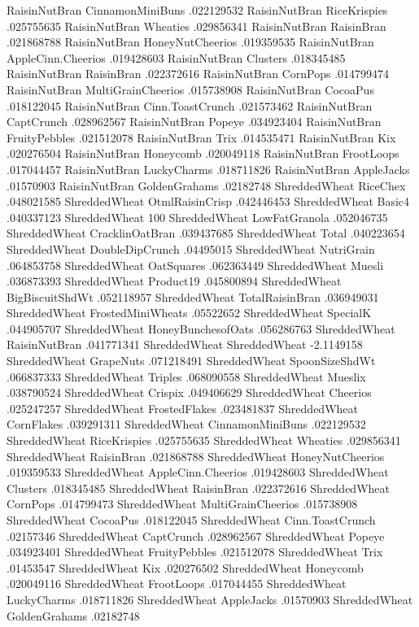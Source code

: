 RaisinNutBran	CinnamonMiniBuns	.022129532
RaisinNutBran	RiceKrispies	.025755635
RaisinNutBran	Wheaties	.029856341
RaisinNutBran	RaisinBran	.021868788
RaisinNutBran	HoneyNutCheerios	.019359535
RaisinNutBran	AppleCinn.Cheerios	.019428603
RaisinNutBran	Clusters	.018345485
RaisinNutBran	RaisinBran	.022372616
RaisinNutBran	CornPops	.014799474
RaisinNutBran	MultiGrainCheerios	.015738908
RaisinNutBran	CocoaPus	.018122045
RaisinNutBran	Cinn.ToastCrunch	.021573462
RaisinNutBran	CaptCrunch	.028962567
RaisinNutBran	Popeye	.034923404
RaisinNutBran	FruityPebbles	.021512078
RaisinNutBran	Trix	.014535471
RaisinNutBran	Kix	.020276504
RaisinNutBran	Honeycomb	.020049118
RaisinNutBran	FrootLoops	.017044457
RaisinNutBran	LuckyCharms	.018711826
RaisinNutBran	AppleJacks	.01570903
RaisinNutBran	GoldenGrahams	.02182748
ShreddedWheat	RiceChex	.048021585
ShreddedWheat	OtmlRaisinCrisp	.042446453
ShreddedWheat	Basic4	.040337123
ShreddedWheat	100%
ShreddedWheat	LowFatGranola	.052046735
ShreddedWheat	CracklinOatBran	.039437685
ShreddedWheat	Total	.040223654
ShreddedWheat	DoubleDipCrunch	.04495015
ShreddedWheat	NutriGrain	.064853758
ShreddedWheat	OatSquares	.062363449
ShreddedWheat	Muesli	.036873393
ShreddedWheat	Product19	.045800894
ShreddedWheat	BigBiscuitShdWt	.052118957
ShreddedWheat	TotalRaisinBran	.036949031
ShreddedWheat	FrostedMiniWheats	.05522652
ShreddedWheat	SpecialK	.044905707
ShreddedWheat	HoneyBunchesofOats	.056286763
ShreddedWheat	RaisinNutBran	.041771341
ShreddedWheat	ShreddedWheat	-2.1149158
ShreddedWheat	GrapeNuts	.071218491
ShreddedWheat	SpoonSizeShdWt	.066837333
ShreddedWheat	Triples	.068090558
ShreddedWheat	Mueslix	.038790524
ShreddedWheat	Crispix	.049406629
ShreddedWheat	Cheerios	.025247257
ShreddedWheat	FrostedFlakes	.023481837
ShreddedWheat	CornFlakes	.039291311
ShreddedWheat	CinnamonMiniBuns	.022129532
ShreddedWheat	RiceKrispies	.025755635
ShreddedWheat	Wheaties	.029856341
ShreddedWheat	RaisinBran	.021868788
ShreddedWheat	HoneyNutCheerios	.019359533
ShreddedWheat	AppleCinn.Cheerios	.019428603
ShreddedWheat	Clusters	.018345485
ShreddedWheat	RaisinBran	.022372616
ShreddedWheat	CornPops	.014799473
ShreddedWheat	MultiGrainCheerios	.015738908
ShreddedWheat	CocoaPus	.018122045
ShreddedWheat	Cinn.ToastCrunch	.02157346
ShreddedWheat	CaptCrunch	.028962567
ShreddedWheat	Popeye	.034923401
ShreddedWheat	FruityPebbles	.021512078
ShreddedWheat	Trix	.01453547
ShreddedWheat	Kix	.020276502
ShreddedWheat	Honeycomb	.020049116
ShreddedWheat	FrootLoops	.017044455
ShreddedWheat	LuckyCharms	.018711826
ShreddedWheat	AppleJacks	.01570903
ShreddedWheat	GoldenGrahams	.02182748
